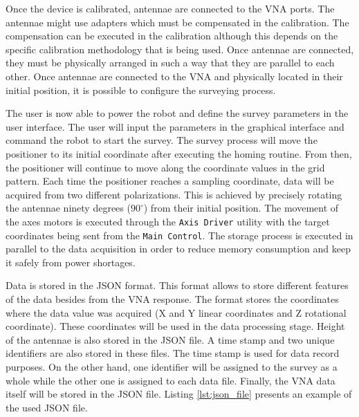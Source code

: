 \documentclass{article}
\begin{document}
Once the device is calibrated, antennae are connected to the VNA ports. The antennae might use adapters which must be compensated in the calibration. The compensation can be executed in the calibration although this depends on the specific calibration methodology that is being used. Once antennae are connected, they must be physically arranged in such a way that they are parallel to each other. Once antennae are connected to the VNA and physically located in their initial position, it is possible to configure the surveying process.

The user is now able to power the robot and define the survey parameters in the user interface. The user will input the parameters in the graphical interface and command the robot to start the survey. The survey process will move the positioner to its initial coordinate after executing the homing routine. From then, the positioner will continue to move along the coordinate values in the grid pattern. Each time the positioner reaches a sampling coordinate, data will be acquired from two different polarizations. This is achieved by precisely rotating the antennae ninety degrees ($90^{\circ}$) from their initial position. The movement of the axes motors is executed through the \texttt{Axis Driver} utility with the target coordinates being sent from the \texttt{Main Control}. The storage process is executed in parallel to the data acquisition in order to reduce memory consumption and keep it safely from power shortages.

Data is stored in the JSON format. This format allows to store different features of the data besides from the VNA response. The format stores the coordinates where the data value was acquired (X and Y linear coordinates and Z rotational coordinate). These coordinates will be used in the data processing stage. Height of the antennae is also stored in the JSON file. A time stamp and two unique identifiers are also stored in these files. The time stamp is used for data record purposes. On the other hand, one identifier will be assigned to the survey as a whole while the other one is assigned to each data file. Finally, the VNA data itself will be stored in the JSON file. Listing \ref{lst:json_file} presents an example of the used JSON file.
\end{document}
